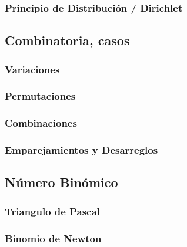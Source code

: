 \subsubsection{Principio de Distribución / Dirichlet}
\subsection{Combinatoria, casos}
\subsubsection{Variaciones}
\subsubsection{Permutaciones}
\subsubsection{Combinaciones}
\subsubsection{Emparejamientos y Desarreglos}
\subsection{Número Binómico}
\subsubsection{Triangulo de Pascal}
\subsubsection{Binomio de Newton}